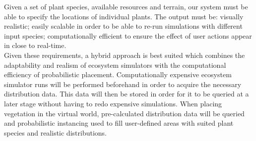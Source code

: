 Given a set of plant species, available resources and terrain, our system must be able to specify the locations of individual plants. The output must be: visually realistic; easily scalable in order to be able to re-run simulations with different input species; computationally efficient to ensure the effect of user actions appear in close to real-time. \\
Given these requirements, a hybrid approach is best suited which combines the adaptability and realism of ecosystem simulators with the computational efficiency of probabilistic placement. Computationally expensive ecosystem simulator runs will be performed beforehand in order to acquire the necessary distribution data. This data will then be stored in order for it to be queried at a later stage without having to redo expensive simulations. When placing vegetation in the virtual world, pre-calculated distribution data will be queried and probabilistic instancing used to fill user-defined areas with suited plant species and realistic distributions. \\